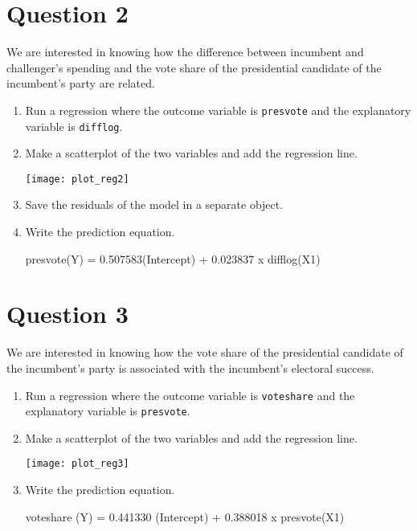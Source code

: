 \documentclass[12pt,letterpaper]{article}
\begin{document}
\section*{Question 2}%
\noindent We are interested in knowing how the difference between incumbent and challenger's spending and the vote share of the presidential candidate of the incumbent's party are related.	\vspace{.25cm}
	\begin{enumerate}
		\item Run a regression where the outcome variable is \texttt{presvote} and the explanatory variable is \texttt{difflog}.	
		  			
		
		\item Make a scatterplot of the two variables and add the regression line. 
		  			
		\texttt{[image: plot\_reg2]}
		
		\item Save the residuals of the model in a separate object.	
		  
					
		\item Write the prediction equation.

\vspace{.5cm}
		presvote(Y) = 0.507583(Intercept) + 0.023837 x difflog(X1)  		
		
	\end{enumerate}
	
\section*{Question 3}%

\noindent We are interested in knowing how the vote share of the presidential candidate of the incumbent's party is associated with the incumbent's electoral success.
	\vspace{.25cm}
	\begin{enumerate}
		\item Run a regression where the outcome variable is \texttt{voteshare} and the explanatory variable is \texttt{presvote}.
		  
		
		\item Make a scatterplot of the two variables and add the regression line. 
		  
		\texttt{[image: plot\_reg3]}		
		
		\item Write the prediction equation.
		
\vspace{.5cm}
		voteshare (Y) = 0.441330 (Intercept) + 0.388018 x presvote(X1) 		
		
	\end{enumerate}
	
\end{document}
